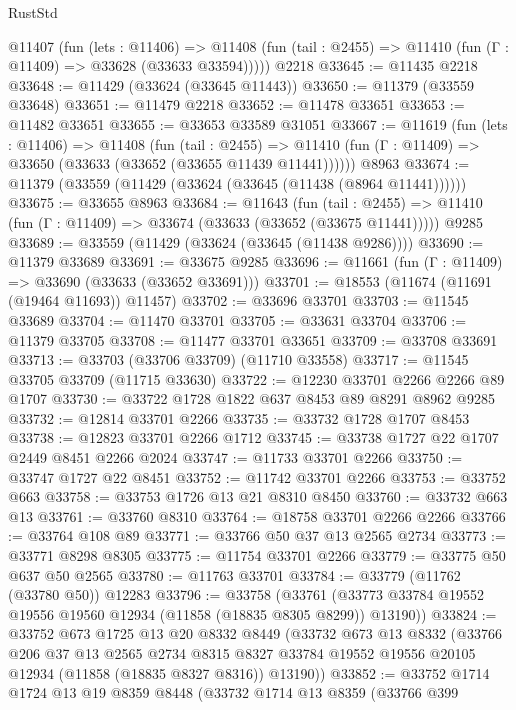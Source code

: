 \begin{lexlean}{RustStd}
\begin{coremodule}
    @11407
      (fun (lets : @11406) =>
      @11408 (fun (tail : @2455) => @11410 (fun (Γ : @11409) => @33628 (@33633 @33594)))))
    @2218
@33645 := @11435 @2218
@33648 := @11429 (@33624 (@33645 @11443))
@33650 := @11379 (@33559 @33648)
@33651 := @11479 @2218
@33652 := @11478 @33651
@33653 := @11482 @33651
@33655 := @33653 @33589 @31051
@33667 := @11619
    (fun (lets : @11406) =>
    @11408
      (fun (tail : @2455) =>
      @11410 (fun (Γ : @11409) => @33650 (@33633 (@33652 (@33655 @11439 @11441))))))
    @8963
@33674 := @11379 (@33559 (@11429 (@33624 (@33645 (@11438 (@8964 @11441))))))
@33675 := @33655 @8963
@33684 := @11643
    (fun (tail : @2455) => @11410 (fun (Γ : @11409) => @33674 (@33633 (@33652 (@33675 @11441)))))
    @9285
@33689 := @33559 (@11429 (@33624 (@33645 (@11438 @9286))))
@33690 := @11379 @33689
@33691 := @33675 @9285
@33696 := @11661 (fun (Γ : @11409) => @33690 (@33633 (@33652 @33691)))
@33701 := @18553 (@11674 (@11691 (@19464 @11693)) @11457)
@33702 := @33696 @33701
@33703 := @11545 @33689
@33704 := @11470 @33701
@33705 := @33631 @33704
@33706 := @11379 @33705
@33708 := @11477 @33701 @33651
@33709 := @33708 @33691
@33713 := @33703 (@33706 @33709) (@11710 @33558)
@33717 := @11545 @33705 @33709 (@11715 @33630)
@33722 := @12230 @33701 @2266 @2266 @89 @1707
@33730 := @33722 @1728 @1822 @637 @8453 @89 @8291 @8962 @9285
@33732 := @12814 @33701 @2266
@33735 := @33732 @1728 @1707 @8453
@33738 := @12823 @33701 @2266 @1712
@33745 := @33738 @1727 @22 @1707 @2449 @8451 @2266 @2024
@33747 := @11733 @33701 @2266
@33750 := @33747 @1727 @22 @8451
@33752 := @11742 @33701 @2266
@33753 := @33752 @663
@33758 := @33753 @1726 @13 @21 @8310 @8450
@33760 := @33732 @663 @13
@33761 := @33760 @8310
@33764 := @18758 @33701 @2266 @2266
@33766 := @33764 @108 @89
@33771 := @33766 @50 @37 @13 @2565 @2734
@33773 := @33771 @8298 @8305
@33775 := @11754 @33701 @2266
@33779 := @33775 @50 @637 @50 @2565
@33780 := @11763 @33701
@33784 := @33779 (@11762 (@33780 @50)) @12283
@33796 := @33758
    (@33761 (@33773 @33784 @19552 @19556 @19560 @12934 (@11858 (@18835 @8305 @8299)) @13190))
@33824 := @33752
    @673
    @1725
    @13
    @20
    @8332
    @8449
    (@33732
      @673
      @13
      @8332
      (@33766
        @206
        @37
        @13
        @2565
        @2734
        @8315
        @8327
        @33784
        @19552
        @19556
        @20105
        @12934
        (@11858 (@18835 @8327 @8316))
        @13190))
@33852 := @33752
    @1714
    @1724
    @13
    @19
    @8359
    @8448
    (@33732
      @1714
      @13
      @8359
      (@33766
        @399

\end{coremodule}
\end{lexlean}
